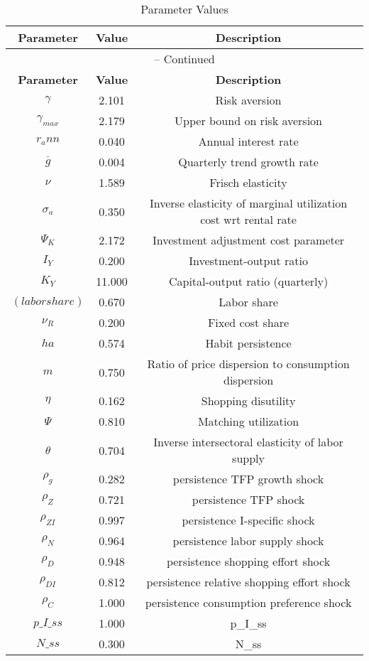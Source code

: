 \begin{center}
\begin{longtable}{ccc}
\caption{Parameter Values}\\%
\toprule%
\multicolumn{1}{c}{\textbf{Parameter}} &
\multicolumn{1}{c}{\textbf{Value}} &
 \multicolumn{1}{c}{\textbf{Description}}\\%
\midrule%
\endfirsthead
\multicolumn{3}{c}{{\tablename} \thetable{} -- Continued}\\%
\midrule%
\multicolumn{1}{c}{\textbf{Parameter}} &
\multicolumn{1}{c}{\textbf{Value}} &
  \multicolumn{1}{c}{\textbf{Description}}\\%
\midrule%
\endhead
${\gamma}$ 	 & 	 2.101 	 & 	 Risk aversion\\
${\gamma_{max}}$ 	 & 	 2.179 	 & 	 Upper bound on risk aversion\\
${r_ann}$ 	 & 	 0.040 	 & 	 Annual interest rate\\
${\overline{g}}$ 	 & 	 0.004 	 & 	 Quarterly trend growth rate\\
$\nu$ 	 & 	 1.589 	 & 	 Frisch elasticity\\
${\sigma_a}$ 	 & 	 0.350 	 & 	 Inverse elasticity of marginal utilization cost wrt rental rate\\
${\Psi_K}$ 	 & 	 2.172 	 & 	 Investment adjustment cost parameter\\
${I_Y}$ 	 & 	 0.200 	 & 	 Investment-output ratio\\
${K_Y}$ 	 & 	 11.000 	 & 	 Capital-output ratio (quarterly)\\
$(labor share)$ 	 & 	 0.670 	 & 	 Labor share\\
${\nu_R}$ 	 & 	 0.200 	 & 	 Fixed cost share\\
${ha}$ 	 & 	 0.574 	 & 	 Habit persistence\\
${m}$ 	 & 	 0.750 	 & 	 Ratio of price dispersion to consumption dispersion\\
${\eta}$ 	 & 	 0.162 	 & 	 Shopping disutility\\
${\Psi}$ 	 & 	 0.810 	 & 	 Matching utilization\\
${\theta}$ 	 & 	 0.704 	 & 	 Inverse intersectoral elasticity of labor supply\\
${\rho_g}$ 	 & 	 0.282 	 & 	 persistence TFP growth shock\\
${\rho_Z}$ 	 & 	 0.721 	 & 	 persistence TFP shock\\
${\rho_{ZI}}$ 	 & 	 0.997 	 & 	 persistence I-specific shock\\
${\rho_N}$ 	 & 	 0.964 	 & 	 persistence labor supply shock\\
${\rho_D}$ 	 & 	 0.948 	 & 	 persistence shopping effort shock\\
${\rho_{DI}}$ 	 & 	 0.812 	 & 	 persistence relative shopping effort shock\\
${\rho_C}$ 	 & 	 1.000 	 & 	 persistence consumption preference shock\\
$p\_I\_ss$ 	 & 	 1.000 	 & 	 p\_I\_ss\\
$N\_ss$ 	 & 	 0.300 	 & 	 N\_ss\\
\bottomrule%
\end{longtable}
\end{center}
